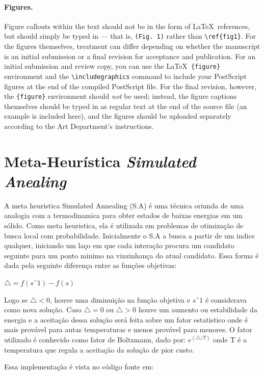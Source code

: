 \documentclass[12pt]{article}
\begin{document}
\paragraph*{Figures.}  Figure callouts within the text should not be
in the form of \LaTeX\ references, but should simply be typed in ---
that is, \verb+(Fig. 1)+ rather than \verb+\ref{fig1}+.  For the
figures themselves, treatment can differ depending on whether the
manuscript is an initial submission or a final revision for acceptance
and publication.  For an initial submission and review copy, you can
use the \LaTeX\ \verb+{figure}+ environment and the
\verb+\includegraphics+ command to include your PostScript figures at
the end of the compiled PostScript file.  For the final revision,
however, the \verb+{figure}+ environment should {\it not\/} be used;
instead, the figure captions themselves should be typed in as regular
text at the end of the source file (an example is included here), and
the figures should be uploaded separately according to the Art
Department's instructions.


\section*{Meta-Heurística \textit{Simulated Anealing}}

A meta heuristica Simulated Annealing (S.A) é uma técnica oriunda de uma analogia com a termodinamica para obter estados de baixas energias em um sólido. Como meta heuristica, ela é utilizada em problemas de otimização de busca local com probabilidade. 
Inicialmente o S.A a busca a partir de um indice qualquer, iniciando um laço em que cada interação procura um candidato seguinte para um ponto minimo na vinzinhança do atual candidato. Essa forma é dada pela seguinte diferença entre as funções objetivas:

$ {\triangle = f (sˆ1) - f(s) }$

Logo se $ {\triangle < 0 }$, houve uma diminuição na função objetiva e $ sˆ1$ é considerava como nova solução. Caso $ {\triangle = 0 }$ ou $ {\triangle > 0 }$ houve um aumento ou estabilidade da energia e a aceitação dessa solução será feita sobre um fator estatistico onde é mais provável para autas temperaturas e menos provável para menores. O fator utilizado é conhecido como fator de Boltzmann, dado por: $ {e^{(\triangle / T)} }$ onde T é a temperatura que regula a aceitação da solução de pior custo.

Essa implementação é vista no código fonte em:
\end{document}
